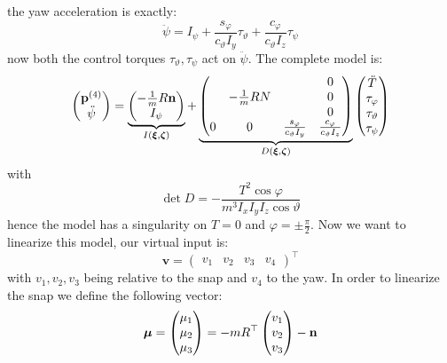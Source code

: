\documentclass[10pt, a4paper]{report}
\begin{document}
the yaw acceleration is exactly:\begin{equation}
    \ddot\psi=I_\psi+\frac{s_\varphi}{c_\vartheta I_y}\tau_\vartheta+\frac{c_\varphi}{c_\vartheta I_z}\tau_\psi
\end{equation}
now both the control torques $\tau_\vartheta,\tau_\psi$ act on $\ddot\psi$. The complete model is:\begin{equation}
    \begin{pmatrix}
        \mathbf p^{(4)}\\
        \ddot\psi 
    \end{pmatrix}=\underbrace{\begin{pmatrix}
        -\frac{1}{m}R\mathbf n\\ I_\psi 
    \end{pmatrix}}_{I({\boldsymbol{\xi}},{\boldsymbol{\zeta}})}+\underbrace{\begin{pmatrix}
        &&& 0\\
        &-\frac{1}{m}RN&& 0\\ &&& 0  \\
        0&0&\frac{s_\varphi}{c_\vartheta I_y}&\frac{c_\varphi}{c_\vartheta I_z}
    \end{pmatrix}}_{D({\boldsymbol{\xi}},{\boldsymbol{\zeta}})}\begin{pmatrix}
            \ddot T\\ \tau_\varphi\\\tau_\vartheta\\\tau_\psi
        \end{pmatrix}
\end{equation}
with\begin{equation}
    \det D=-\frac{T^2\cos\varphi}{m^3I_xI_yI_z\cos\vartheta}
\end{equation}
hence the model has a singularity on $T=0$ and $\varphi=\pm\frac{\pi}{2}$. Now we want to linearize this model, our virtual input is:\begin{equation}
    \mathbf v=\begin{pmatrix}
        v_1&v_2&v_3&v_4 
    \end{pmatrix}^\top
\end{equation}
with $v_1,v_2,v_3$ being relative to the snap and $v_4$ to the yaw. In order to linearize the snap we define the following vector:\begin{equation}
        {\boldsymbol{\mu}}=\begin{pmatrix}
            \mu_1\\\mu_2\\\mu_3 
        \end{pmatrix}=-mR^\top\begin{pmatrix}
        v_1\\ v_2\\ v_3
    \end{pmatrix}-\mathbf n
    \end{equation}
\end{document}
